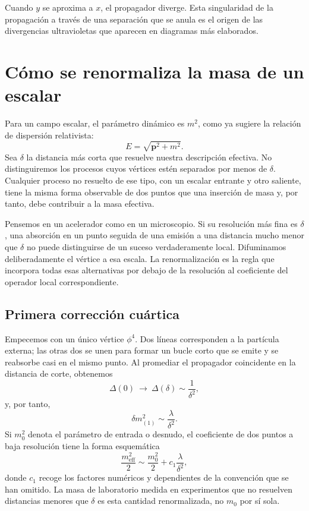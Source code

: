 Cuando \(y\) se aproxima a \(x\), el propagador diverge. Esta singularidad de la propagación a través de una separación que se anula es el origen de las divergencias ultravioletas que aparecen en diagramas más elaborados.

\section{Cómo se renormaliza la masa de un escalar}

Para un campo escalar, el parámetro dinámico es \(m^2\), como ya sugiere la relación de dispersión relativista:
\begin{equation}
E=\sqrt{\mathbf p^2+m^2}.
\end{equation}
Sea \(\delta\) la distancia más corta que resuelve nuestra descripción efectiva. No distinguiremos los procesos cuyos vértices estén separados por menos de \(\delta\). Cualquier proceso no resuelto de ese tipo, con un escalar entrante y otro saliente, tiene la misma forma observable de dos puntos que una inserción de masa y, por tanto, debe contribuir a la masa efectiva.

Pensemos en un acelerador como en un microscopio. Si su resolución más fina es \(\delta\), una absorción en un punto seguida de una emisión a una distancia mucho menor que \(\delta\) no puede distinguirse de un suceso verdaderamente local. Difuminamos deliberadamente el vértice a esa escala. La renormalización es la regla que incorpora todas esas alternativas por debajo de la resolución al coeficiente del operador local correspondiente.

\subsection{Primera corrección cuártica}

Empecemos con un único vértice \(\phi^4\). Dos líneas corresponden a la partícula externa; las otras dos se unen para formar un bucle corto que se emite y se reabsorbe casi en el mismo punto. Al promediar el propagador coincidente en la distancia de corte, obtenemos
\begin{equation}
\Delta(0)\ \longrightarrow\ \Delta(\delta)\sim\frac{1}{\delta^2},
\end{equation}
y, por tanto,
\begin{equation}
\delta m^2_{(1)}\sim\frac{\lambda}{\delta^2}.
\label{eq:one-loop-scalar-mass}
\end{equation}
Si \(m_0^2\) denota el parámetro de entrada o desnudo, el coeficiente de dos puntos a baja resolución tiene la forma esquemática
\begin{equation}
\frac{m_{\mathrm{eff}}^2}{2}
\sim
\frac{m_0^2}{2}
+c_1\frac{\lambda}{\delta^2},
\label{eq:first-renormalized-mass}
\end{equation}
donde \(c_1\) recoge los factores numéricos y dependientes de la convención que se han omitido. La masa de laboratorio medida en experimentos que no resuelven distancias menores que \(\delta\) es esta cantidad renormalizada, no \(m_0\) por sí sola.

